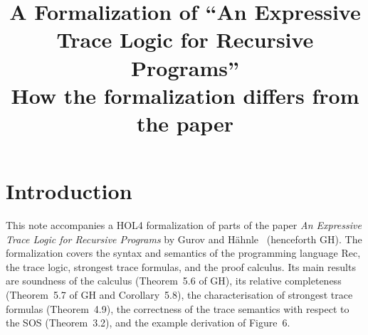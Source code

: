 \documentclass[11pt]{article}
\title{A Formalization of ``An Expressive Trace Logic for Recursive
  Programs''\\[0.3em]
  \large How the formalization differs from the paper}
\author{}
\date{}
\newcommand{\GH}[1]{#1 of GH}
\theoremstyle{plain}
\theoremstyle{definition}
\theoremstyle{remark}
\begin{document}
\maketitle

\section{Introduction}

This note accompanies a HOL4 formalization of parts of the paper
\emph{An Expressive Trace Logic for Recursive Programs} by Gurov and
H\"ahnle~\cite{GH} (henceforth GH). The formalization covers the syntax and
semantics of the programming language Rec, the trace logic, strongest trace
formulas, and the proof calculus. Its main results are soundness of the
calculus (\GH{Theorem~5.6}), its relative completeness (\GH{Theorem~5.7}
and Corollary~5.8), the characterisation of strongest trace formulas
(Theorem~4.9), the correctness of the trace semantics with respect to the
SOS (Theorem~3.2), and the example derivation of Figure~6.
\end{document}

